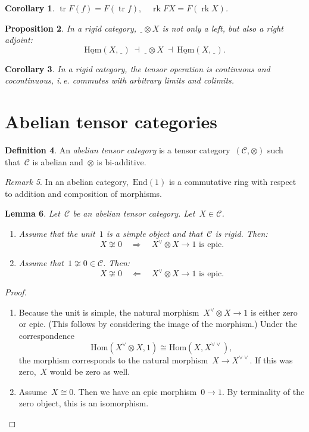 \documentclass[a4paper,english,12pt]{scrartcl}
\theoremstyle{definition}
\newtheorem{defn}{Definition}[section]
\theoremstyle{plain}
\newtheorem{prop}[defn]{Proposition}
\newtheorem{lemma}[defn]{Lemma}
\newtheorem{cor}[defn]{Corollary}
\theoremstyle{remark}
\newtheorem{rem}[defn]{Remark}
\newcommand{\C}{\mathcal{C}}
\renewcommand{\_}{\mathpunct{.}\,}
\newcommand{\?}{\,{:}\,}
\newcommand{\Hom}{\underline{\mathrm{Hom}}}
\renewcommand{\hom}{\mathrm{Hom}}
\newcommand{\End}{\mathrm{End}}
\newcommand{\freist}{\underline{\ \ }}
\newcommand{\tr}{\operatorname{tr}}
\newcommand{\rk}{\operatorname{rk}}
\begin{document}
\begin{cor}$\tr F(f) = F(\tr f), \quad \rk FX = F(\rk X)$.\end{cor}

\begin{prop}In a rigid category, $\freist \otimes X$ is not only a left, but
also a right adjoint:
\[ \Hom(X,\freist) \ \dashv\  \freist \otimes X \ \dashv\  \Hom(X,\freist). \]
\end{prop}
\begin{cor}In a rigid category, the tensor operation is continuous and
cocontinuous, i.\,e. commutes with arbitrary limits and colimits.\end{cor}


\section{Abelian tensor categories}

\begin{defn}An \emph{abelian tensor category} is a tensor
category~$(\C,\otimes)$ such that~$\C$ is abelian and~$\otimes$ is
bi-additive.\end{defn}

\begin{rem}In an abelian category,~$\End(1)$ is a commutative ring with respect
to addition and composition of morphisms.\end{rem}

\begin{lemma}Let~$\C$ be an abelian tensor category. Let~$X \in \C$.
\begin{enumerate}
\item Assume that the unit~$1$ is a simple object and that~$\C$ is rigid. Then:
\[ X \not\cong 0 \quad\Longrightarrow\quad
  \text{$X^\vee \otimes X \to 1$ is epic.} \]
\item Assume that~$1 \not\cong 0 \in \C$. Then:
\[ X \not\cong 0 \quad\Longleftarrow\quad
  \text{$X^\vee \otimes X \to 1$ is epic.} \]
\end{enumerate}
\end{lemma}
\begin{proof}
\begin{enumerate}
\item Because the unit is simple, the natural morphism~$X^\vee \otimes X \to 1$
is either zero or epic. (This follows by considering the image of the
morphism.) Under the correspondence
\[ \hom(X^\vee \otimes X,1) \cong \hom(X,X^{\vee\vee}), \]
the morphism corresponds to the natural morphism~$X \to X^{\vee\vee}$. If this
was zero,~$X$ would be zero as well.
\item Assume~$X \cong 0$. Then we have an epic morphism~$0 \to 1$. By
terminality of the zero object, this is an isomorphism.\qedhere
\end{enumerate}
\end{proof}
\end{document}
